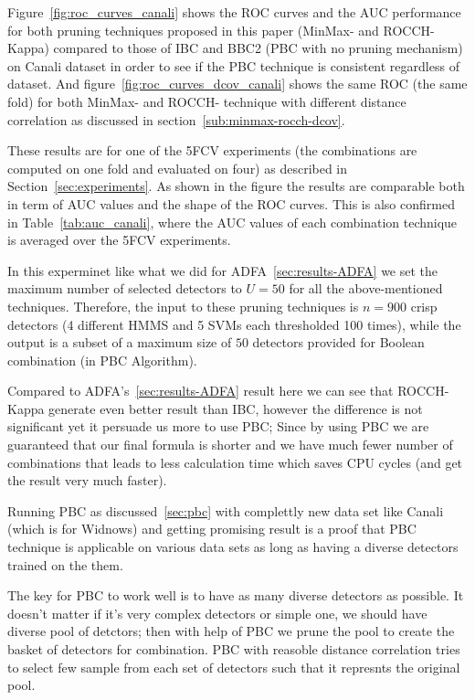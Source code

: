 Figure~\ref{fig:roc_curves_canali} shows the ROC curves and the AUC performance for both pruning techniques proposed in this paper (MinMax- and ROCCH-Kappa) compared to those of IBC and BBC2 (PBC with no pruning mechanism) on Canali dataset in order to see if the PBC technique is consistent regardless of dataset. And figure~\ref{fig:roc_curves_dcov_canali} shows the same ROC (the same fold) for both MinMax- and ROCCH- technique with different distance correlation as discussed in section~\ref{sub:minmax-rocch-dcov}.

These results are for one of the 5FCV experiments (the combinations are computed on one fold and evaluated on four) as described in Section~\ref{sec:experiments}.
As shown in the figure the results are comparable both in term of AUC values and the shape of the ROC curves.
This is also confirmed in Table~\ref{tab:auc_canali}, where the AUC values of each combination technique is averaged over the 5FCV experiments.

In this experminet like what we did for ADFA~\ref{sec:results-ADFA} we set the maximum number of selected detectors to $U=50$ for all the above-mentioned techniques.
Therefore, the input to these pruning techniques is $n=900$ crisp detectors (4 different HMMS and 5 SVMs each thresholded 100 times), while the output is a subset of a maximum size of $50$ detectors provided for Boolean combination (in PBC Algorithm).

Compared to ADFA's~\ref{sec:results-ADFA} result here we can see that ROCCH-Kappa generate even better result than IBC, however the difference is not significant yet it persuade us more to use PBC; Since by using PBC we are guaranteed that our final formula is shorter and we have much fewer number of combinations that leads to less calculation time which saves CPU cycles (and get the result very much faster).

Running PBC as discussed~\ref{sec:pbc} with complettly new data set like Canali (which is for Widnows) and getting promising result is a proof that PBC technique is applicable on various data sets as long as having a diverse detectors trained on the them.

The key for PBC to work well is to have as many diverse detectors as possible. It doesn't matter if it's very complex detectors or simple one, we should have diverse pool of detctors; then with help of PBC we prune the pool to create the basket of detectors for combination. PBC with reasoble distance correlation tries to  select few sample from each set of detectors such that it represnts the original pool.


